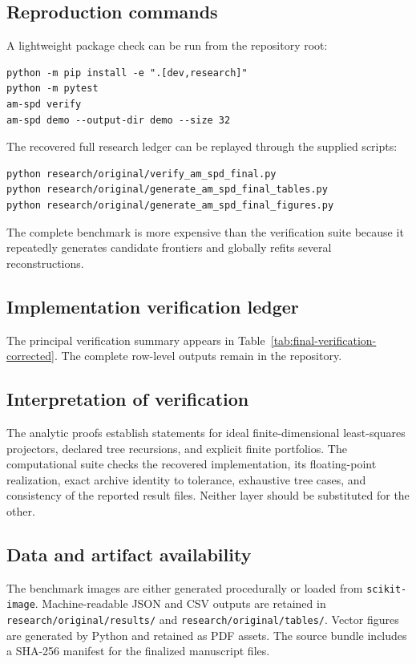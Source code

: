 \documentclass[11pt]{article}
\theoremstyle{definition}
\theoremstyle{remark}
\begin{document}
\subsection{Reproduction commands}
A lightweight package check can be run from the repository root:
\begin{lstlisting}[style=shellstyle]
python -m pip install -e ".[dev,research]"
python -m pytest
am-spd verify
am-spd demo --output-dir demo --size 32
\end{lstlisting}

The recovered full research ledger can be replayed through the supplied scripts:
\begin{lstlisting}[style=shellstyle]
python research/original/verify_am_spd_final.py
python research/original/generate_am_spd_final_tables.py
python research/original/generate_am_spd_final_figures.py
\end{lstlisting}
The complete benchmark is more expensive than the verification suite because it repeatedly generates candidate frontiers and globally refits several reconstructions.

\subsection{Implementation verification ledger}
The principal verification summary appears in Table~\ref{tab:final-verification-corrected}. The complete row-level outputs remain in the repository.

\subsection{Interpretation of verification}
The analytic proofs establish statements for ideal finite-dimensional least-squares projectors, declared tree recursions, and explicit finite portfolios. The computational suite checks the recovered implementation, its floating-point realization, exact archive identity to tolerance, exhaustive tree cases, and consistency of the reported result files. Neither layer should be substituted for the other.

\subsection{Data and artifact availability}
The benchmark images are either generated procedurally or loaded from \texttt{scikit-image}. Machine-readable JSON and CSV outputs are retained in \texttt{research/original/results/} and \texttt{research/original/tables/}. Vector figures are generated by Python and retained as PDF assets. The source bundle includes a SHA-256 manifest for the finalized manuscript files.
\end{document}
